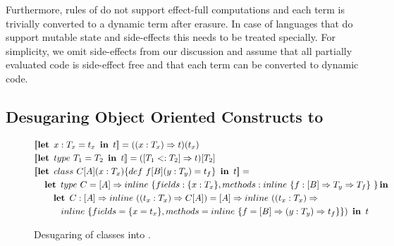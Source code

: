Furthermore, rules of \calculus do not support effect-full computations and each
  term is trivially converted to a dynamic term after erasure.
 In case of languages that do support mutable state and side-effects this needs to
 be treated specially. For simplicity, we omit side-effects from our discussion and
 assume that all partially evaluated code is side-effect free and that each
  term can be converted to dynamic code.

\subsection{Desugaring Object Oriented Constructs to \calculus}
\label{sct:desugaring}

\begin{figure}
\begin{alignat*}{2}
   & [\![ \klet\ x: T_x = t_x\ \kin \ t ]\!] = ((x: T_x) \ra t)(t_x)\\
   & [\![ \klet\ type\ T_1 = T_2\ \kin\ t ]\!] =  ([T_1 <: T_2] \ra t)[T_2] \\
   & [\![ \klet\ class\ C[A](x: T_x) \{ def\ f[B](y: T_y) = t_f \}\ \kin\ t ]\!]  =  \\
   & \quad   \klet\ type\  C = [A] \ra \inline \{ fields: \{ x: T_x \}, methods: \inline \{ f: [B] \ra T_y \ra T_f \}\ \} \kin  \\
   & \quad \quad \klet\ C: [A] \ra \inline((t_x: T_x) \ra C[A])  =  [A] \ra \inline((t_x: T_x) \ra\\
   & \quad \quad \quad  \inline \{ fields = \{x = t_x\}, methods = \inline \{f = [B] \ra (y: T_y) \ra t_f \}\}) \ \kin\ t
\end{alignat*}
\caption{Desugaring of classes into \calculus.}
\label{fig:desugaring-classes}
\end{figure}


